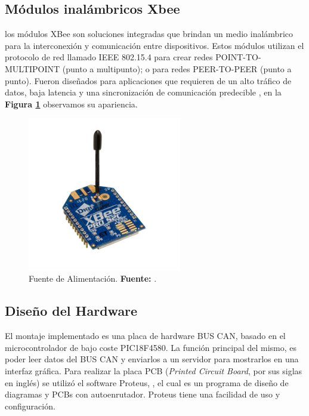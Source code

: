 \subsection{Módulos inalámbricos Xbee}
 los módulos XBee son soluciones integradas que brindan un medio inalámbrico para la interconexión y comunicación entre dispositivos. Estos módulos utilizan el protocolo de red llamado IEEE 802.15.4 para crear redes POINT-TO-MULTIPOINT (punto a multipunto); o para redes PEER-TO-PEER (punto a punto). Fueron diseñados para aplicaciones que requieren de un alto tráfico de datos, baja latencia y una sincronización de comunicación predecible \cite{xbee_c4}, en la \textbf{Figura \ref{fig_xbee_4}} observamos su apariencia. 
 
\begin{figure}[H]
	\centering
		\includegraphics[width=0.6\textwidth]{./Cap4imagen/xbee_modulo.jpg}
	\caption[Fuente de Alimentación.]{Fuente de Alimentación.\textbf{ Fuente:}  \cite{cite_xbee_4}.}
	\label{fig_xbee_4} %
\end{figure}


\subsection{Diseño del Hardware}
El montaje implementado es una placa de hardware BUS CAN, basado en el microcontrolador de bajo coste PIC18F4580. La función principal del mismo, es poder leer datos del BUS
CAN y enviarlos a un servidor para mostrarlos en una interfaz gráfica. Para realizar la placa PCB (\textit{Printed Circuit Board}, por sus siglas en inglés) se utilizó el software Proteus, \cite{pro},  el cual es un programa de diseño de diagramas y PCBs con autoenrutador. Proteus tiene una facilidad de uso y configuración.

